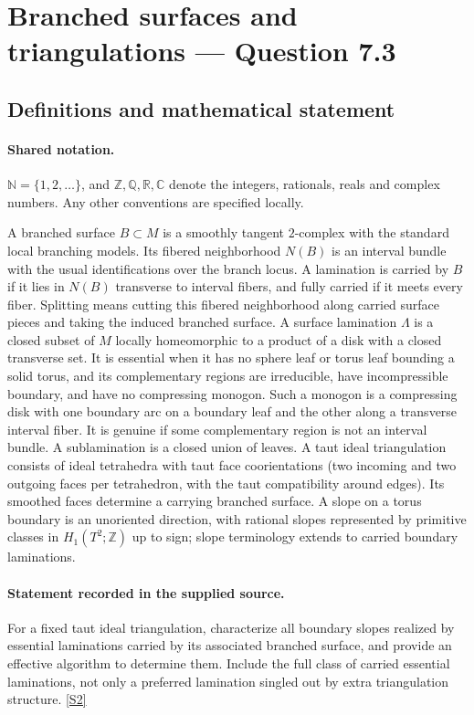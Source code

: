 \documentclass[11pt]{article}
\newcommand{\sref}[2]{\hyperlink{source:#1:#2}{[S#2]}}
\begin{document}
\section{Branched surfaces and triangulations — Question 7.3}\label{statement}

\subsection{Definitions and mathematical statement}

\paragraph{Shared notation.}$\mathbb N=\{1,2,\ldots\}$, and $\mathbb Z,\mathbb Q,\mathbb R,\mathbb C$ denote the integers, rationals, reals and complex numbers. Any other conventions are specified locally.


A branched surface $B\subset M$ is a smoothly tangent $2$-complex with the standard local branching models. Its fibered neighborhood $N(B)$ is an interval bundle with the usual identifications over the branch locus. A lamination is carried by $B$ if it lies in $N(B)$ transverse to interval fibers, and fully carried if it meets every fiber. Splitting means cutting this fibered neighborhood along carried surface pieces and taking the induced branched surface. A surface lamination $\Lambda$ is a closed subset of $M$ locally homeomorphic to a product of a disk with a closed transverse set. It is essential when it has no sphere leaf or torus leaf bounding a solid torus, and its complementary regions are irreducible, have incompressible boundary, and have no compressing monogon. Such a monogon is a compressing disk with one boundary arc on a boundary leaf and the other along a transverse interval fiber. It is genuine if some complementary region is not an interval bundle. A sublamination is a closed union of leaves. A taut ideal triangulation consists of ideal tetrahedra with taut face coorientations (two incoming and two outgoing faces per tetrahedron, with the taut compatibility around edges). Its smoothed faces determine a carrying branched surface. A slope on a torus boundary is an unoriented direction, with rational slopes represented by primitive classes in $H_1(T^2;\mathbb Z)$ up to sign; slope terminology extends to carried boundary laminations.
\paragraph{Statement recorded in the supplied source.}
For a fixed taut ideal triangulation, characterize all boundary slopes realized by essential laminations carried by its associated branched surface, and provide an effective algorithm to determine them. Include the full class of carried essential laminations, not only a preferred lamination singled out by extra triangulation structure. \sref{statement}{2}
\end{document}
